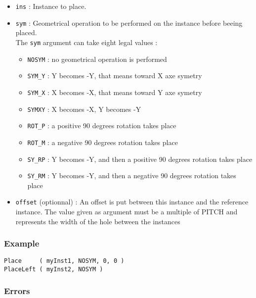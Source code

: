 \begin{itemize}
    \item \verb-ins- : Instance to place.
    \item \verb-sym- : Geometrical operation to be performed on the instance before beeing placed.\\The \verb-sym- argument can take eight legal values :
    \begin{itemize}
        \item \verb-NOSYM- : no geometrical operation is performed
        \item \verb-SYM_Y- : Y becomes -Y, that means toward X axe symetry
        \item \verb-SYM_X- : X becomes -X, that means toward Y axe symetry
        \item \verb-SYMXY- : X becomes -X, Y becomes -Y
        \item \verb-ROT_P- : a positive 90 degrees rotation takes place
        \item \verb-ROT_M- : a negative 90 degrees rotation takes place
        \item \verb-SY_RP- : Y becomes -Y, and then a positive 90 degrees rotation takes place
        \item \verb-SY_RM- : Y becomes -Y, and then a negative 90 degrees rotation takes place
    \end{itemize}
    \item \verb-offset- (optionnal) : An offset is put between this instance and the reference instance. The value given as argument must be a multiple of PITCH and represents the width of the hole between the instances    
\end{itemize}

\subsubsection{Example}

\begin{verbatim}
Place     ( myInst1, NOSYM, 0, 0 )
PlaceLeft ( myInst2, NOSYM )
\end{verbatim}

\subsubsection{Errors}
    
